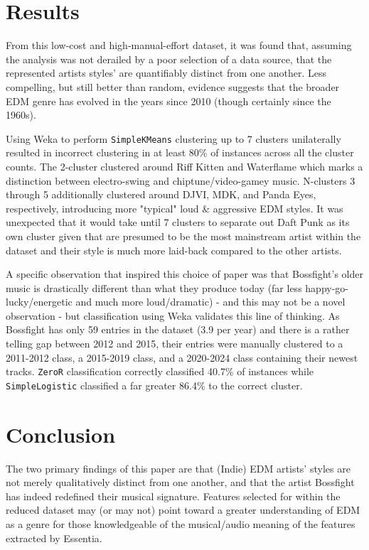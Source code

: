 \documentclass[article,pdftex,12pt,a4paper]{article}
\def\code#1{\texttt{#1}}
\begin{document}
\section{Results}
From this low-cost and high-manual-effort dataset, it was found that, assuming the analysis was not derailed by a poor selection of a data source, that the represented artists styles' are quantifiably distinct from one another. Less compelling, but still better than random, evidence suggests that the broader EDM genre has evolved in the years since 2010 (though certainly since the 1960s).

Using Weka to perform \code{SimpleKMeans} clustering up to 7 clusters unilaterally resulted in incorrect clustering in at least 80\% of instances across all the cluster counts. The 2-cluster clustered around Riff Kitten and Waterflame which marks a distinction between electro-swing and chiptune/video-gamey music. N-clusters 3 through 5 additionally clustered around DJVI, MDK, and Panda Eyes, respectively, introducing more "typical" loud \& aggressive EDM styles. It was unexpected that it would take until 7 clusters to separate out Daft Punk as its own cluster given that are presumed to be the most mainstream artist within the dataset and their style is much more laid-back compared to the other artists.

A specific observation that inspired this choice of paper was that Bossfight's older music is drastically different than what they produce today (far less happy-go-lucky/energetic and much more loud/dramatic) - and this may not be a novel observation - but classification using Weka validates this line of thinking.  As Bossfight has only 59 entries in the dataset (3.9 per year) and there is a rather telling gap between 2012 and 2015, their entries were manually clustered to a 2011-2012 class, a 2015-2019 class, and a 2020-2024 class containing their newest tracks. \code{ZeroR} classification correctly classified 40.7\% of instances while \code{SimpleLogistic} classified a far greater 86.4\% to the correct cluster.


\section{Conclusion}
The two primary findings of this paper are that (Indie) EDM artists' styles are not merely qualitatively distinct from one another, and that the artist Bossfight has indeed redefined their musical signature. Features selected for within the reduced dataset may (or may not) point toward a greater understanding of EDM as a genre for those knowledgeable of the musical/audio meaning of the features extracted by Essentia.
\end{document}
